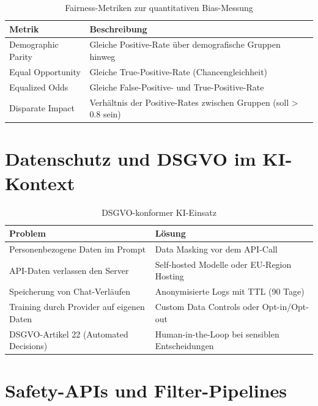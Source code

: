 \begin{table}[H]
\centering
\begin{tabularx}{\linewidth}{lX}
\toprule
\textbf{Metrik} & \textbf{Beschreibung} \\
\midrule
Demographic Parity & Gleiche Positive-Rate über demografische Gruppen hinweg \\
Equal Opportunity & Gleiche True-Positive-Rate (Chancengleichheit) \\
Equalized Odds & Gleiche False-Positive- und True-Positive-Rate \\
Disparate Impact & Verhältnis der Positive-Rates zwischen Gruppen (soll > 0.8 sein) \\
\bottomrule
\end{tabularx}
\caption{Fairness-Metriken zur quantitativen Bias-Messung}
\end{table}

\section{Datenschutz und DSGVO im KI-Kontext}

\begin{table}[H]
\centering
\begin{tabularx}{\linewidth}{lX}
\toprule
\textbf{Problem} & \textbf{Lösung} \\
\midrule
Personenbezogene Daten im Prompt & Data Masking vor dem API-Call \\
API-Daten verlassen den Server & Self-hosted Modelle oder EU-Region Hosting \\
Speicherung von Chat-Verläufen & Anonymisierte Logs mit TTL (90 Tage) \\
Training durch Provider auf eigenen Daten & Custom Data Controls oder Opt-in/Opt-out \\
DSGVO-Artikel 22 (Automated Decisions) & Human-in-the-Loop bei sensiblen Entscheidungen \\
\bottomrule
\end{tabularx}
\caption{DSGVO-konformer KI-Einsatz}
\end{table}

\section{Safety-APIs und Filter-Pipelines}


